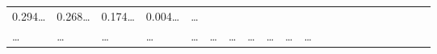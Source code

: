 \documentclass[
]{article}
\begin{document}
\begin{longtable}[]{@{}lllllllllllllllllllll@{}}
\begin{minipage}[t]{0.03\columnwidth}
0.294\ldots{}\strut
\end{minipage} & \begin{minipage}[t]{0.03\columnwidth}\raggedright
0.268\ldots{}\strut
\end{minipage} & \begin{minipage}[t]{0.03\columnwidth}\raggedright
0.174\ldots{}\strut
\end{minipage} & \begin{minipage}[t]{0.03\columnwidth}\raggedright
0.004\ldots{}\strut
\end{minipage} & \begin{minipage}[t]{0.01\columnwidth}\raggedright
\ldots{}\strut
\end{minipage}\tabularnewline
\begin{minipage}[t]{0.03\columnwidth}\raggedright
\ldots{}\strut
\end{minipage} & \begin{minipage}[t]{0.03\columnwidth}\raggedright
\ldots{}\strut
\end{minipage} & \begin{minipage}[t]{0.03\columnwidth}\raggedright
\ldots{}\strut
\end{minipage} & \begin{minipage}[t]{0.03\columnwidth}\raggedright
\ldots{}\strut
\end{minipage} & \begin{minipage}[t]{0.03\columnwidth}\raggedright
\ldots{}\strut
\end{minipage} & \begin{minipage}[t]{0.03\columnwidth}\raggedright
\ldots{}\strut
\end{minipage} & \begin{minipage}[t]{0.03\columnwidth}\raggedright
\ldots{}\strut
\end{minipage} & \begin{minipage}[t]{0.03\columnwidth}\raggedright
\ldots{}\strut
\end{minipage} & \begin{minipage}[t]{0.03\columnwidth}\raggedright
\ldots{}\strut
\end{minipage} & \begin{minipage}[t]{0.03\columnwidth}\raggedright
\ldots{}\strut
\end{minipage} & \begin{minipage}[t]{0.03\columnwidth}\raggedright
\ldots{}\strut
\end{minipage} & \begin{minipage}[t]{0.03\columnwidth}\raggedright

\end{minipage}
\end{longtable}
\end{document}
